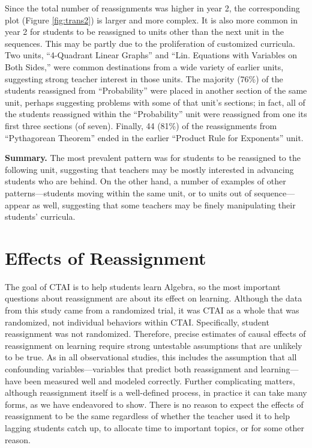 \documentclass[notitlepage,12pt]{jedm}\usepackage[]{graphicx}\usepackage[]{color}
\begin{document}
Since the total number of reassignments was higher in year 2, the corresponding plot (Figure \ref{fig:trans2}) is larger and more complex.
It is also more common in year 2 for students to be reassigned to units other than the next unit in the sequences.
This may be partly due to the proliferation of customized curricula.
Two units, ``4-Quadrant Linear Graphs'' and ``Lin. Equations with
Variables on Both Sides,'' were common destinations from a wide
variety of earlier units, suggesting strong teacher interest in those units.
The majority (76\%)
of the students reassigned from ``Probability'' were placed in another section of the same unit, perhaps suggesting problems with some of that unit's sections; in fact, all of the students reassigned within the ``Probability'' unit were reassigned from one its first three sections (of seven).
Finally, 44
(81\%) of the reassignments from ``Pythagorean Theorem'' ended in the earlier ``Product Rule for Exponents'' unit.

\textbf{Summary.} The most prevalent pattern was for students to be reassigned
to the following unit, suggesting that teachers may be mostly
interested in advancing students who are behind.
On the other hand, a number of examples of other patterns---students moving within the same unit, or to units out of sequence---appear as well, suggesting that some teachers may be finely manipulating their students' curricula.



\section{Effects of Reassignment}\label{sec:effects}
The goal of CTAI is to help students learn Algebra, so
the most important questions about reassignment are about its effect on learning.
Although the data from this study came from a randomized trial, it was
CTAI as a whole that was randomized, not individual behaviors within CTAI.
Specifically, student reassignment was not randomized.
Therefore, precise estimates of causal effects of reassignment on
learning require strong untestable assumptions that are unlikely to be
true.
As in all observational studies, this includes the assumption that all
confounding variables---variables that predict both reassignment and
learning---have been measured well and modeled correctly.
Further complicating matters, although reassignment itself is a
well-defined process, in practice it can take many forms, as we have
endeavored to show.
There is no reason to expect the effects of reassignment to be
the same regardless of whether the teacher used it to help lagging
students catch up, to allocate time to important topics, or for some
other reason.
\end{document}
